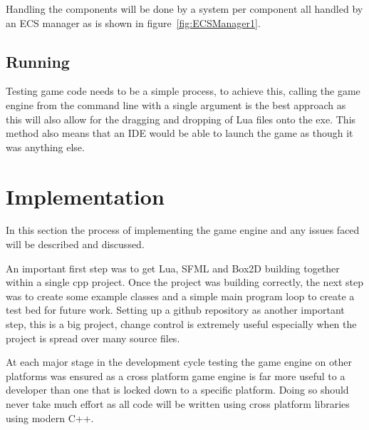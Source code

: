 \documentclass[11pt,a4paper,titlepage]{report}
\begin{document}
	Handling the components will be done by a system per component all handled by an ECS manager as is shown in figure~\ref{fig:ECSManager1}.

	\section{Running}

	Testing game code needs to be a simple process, to achieve this, calling the game engine from the command line with a single argument is the best approach as this will also allow for the dragging and dropping of Lua files onto the exe. This method also means that an IDE would be able to launch the game as though it was anything else.








\chapter{Implementation}


	In this section the process of implementing the game engine and any issues faced will be described and discussed.

    
    An important first step was to get Lua, SFML and Box2D building together within a single cpp project. Once the project was building correctly, the next step was to create some example classes and a simple main program loop to create a test bed for future work. Setting up a github repository as another important step, this is a big project, change control is extremely useful especially when the project is spread over many source files.

    At each major stage in the development cycle testing the game engine on other platforms was ensured as a cross platform game engine is far more useful to a developer than one that is locked down to a specific platform. Doing so should never take much effort as all code will be written using cross platform libraries using modern C++.

    
\end{document}
